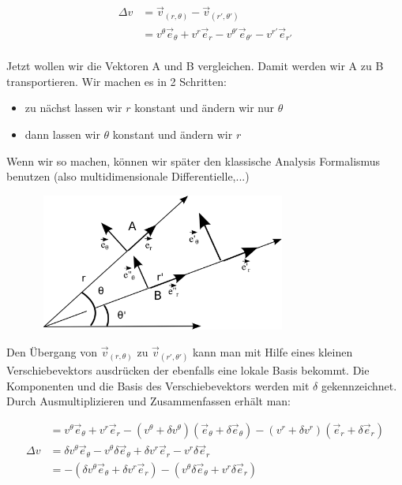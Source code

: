 \documentclass[11pt,a4paper]{article}
\begin{document}
\begin{align*}
	\Delta v &=   \overrightarrow{v}_{(r,\theta)} - \overrightarrow{v}_{(r',\theta')}\\
			&=  v^{\theta} \overrightarrow{e}_{\theta} + v^{r} \overrightarrow{e}_{r}  - v^{\theta'} \overrightarrow{e}_{\theta'} - v^{r'} \overrightarrow{e}_{r'}   \\
\end{align*} 

Jetzt wollen wir die Vektoren A und B vergleichen. Damit werden wir A zu B transportieren. Wir machen es in 2 Schritten:
\begin{itemize}
\item zu nächst lassen wir $r$ konstant und ändern wir nur $\theta$
\item dann lassen wir $\theta$ konstant und ändern wir $r$
\end{itemize}
Wenn wir so machen, können wir später den klassische Analysis Formalismus benutzen (also multidimensionale Differentielle,...)

\begin{figure}
  \centering
  \mbox{
    \includegraphics[width=8cm]{img/Christoffel-Zeichnung -Verschiebung theta.png}
  }
    \captionsetup{singlelinecheck=off}
    \label{fig:Verschiebung Teil 1}
\end{figure}


Den Übergang von $ \overrightarrow{v}_{(r,\theta)} $ zu $ \overrightarrow{v}_{(r',\theta')} $ kann man mit Hilfe eines kleinen Verschiebevektors ausdrücken der ebenfalls eine lokale Basis bekommt. Die Komponenten und die Basis des Verschiebevektors werden mit $\delta$ gekennzeichnet. Durch Ausmultiplizieren und Zusammenfassen erhält man:

\begin{align*}
	&= v^{\theta} \overrightarrow{e}_{\theta} + v^{r} \overrightarrow{e}_{r} - (v^{\theta} + \delta v^{\theta})(\overrightarrow{e}_{\theta} + \delta\overrightarrow{e}_{\theta}) - (v^{r} + \delta v^{r})(\overrightarrow{e}_{r} + \delta\overrightarrow{e}_{r}) \\
	\Delta v &= \delta v^{\theta} \overrightarrow{e}_{\theta} - 
	   v^{\theta} \delta \overrightarrow{e}_{\theta} + 
	   \delta v^{r} \overrightarrow{e}_{r} - 
	   v^{r} \delta \overrightarrow{e}_{r}						\\
	&= - (\delta v^{\theta} \overrightarrow{e}_{\theta} + 
	    \delta v^{r} \overrightarrow{e}_{r} ) - 
	   ( v^{\theta} \delta\overrightarrow{e}_{\theta} + 
	     v^{r} \delta\overrightarrow{e}_{r} )
\end{align*} 
\end{document}
